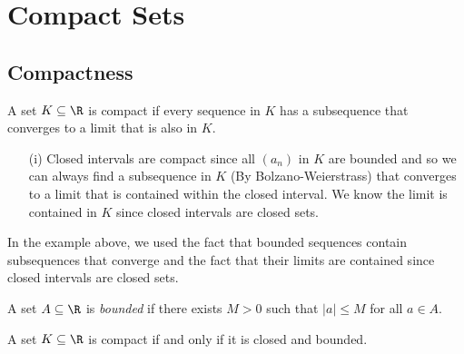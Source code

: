 
\section{Compact Sets}

\subsection{Compactness}
\begin{tcolorbox}
\begin{defn}
A set \( K \subseteq \R \) is compact if every sequence in \( K \) has a subsequence that converges to a limit that is also in \( K \).
\end{defn}
\end{tcolorbox}

\begin{ex}
\begin{enumerate}
    \item[(i)] Closed intervals are compact since all \( (a_n) \) in \( K \) are bounded and so we can always find a subsequence in \( K \) (By Bolzano-Weierstrass) that converges to a limit that is contained within the closed interval. We know the limit is contained in \( K \) since closed intervals are closed sets. 
\end{enumerate}
\end{ex}

In the example above, we used the fact that bounded sequences contain subsequences that converge and the fact that their limits are contained since closed intervals are closed sets. 

\begin{tcolorbox}
\begin{defn}
A set \( A \subseteq \R \) is \textit{bounded} if there exists \( M > 0  \) such that \( | a | \leq M  \) for all \( a \in A \).
\end{defn}
\end{tcolorbox}

\begin{tcolorbox}
    \begin{thm}
    A set \( K \subseteq \R \) is compact if and only if it is closed and bounded.
    \end{thm}
\end{tcolorbox}

